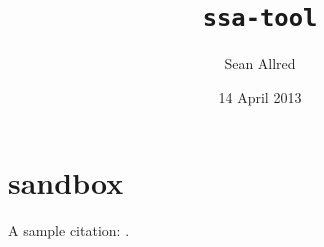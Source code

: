 \documentclass{cs-smp}[2013/12/23]
\title
                         {\texttt{ssa-tool}}%
            [A Utility for the Creation and Evaluation \\
                   of Self-Stabilizing Algorithms]
\author
                            {Sean Allred}%
                           [Alan Jamieson]
\date
                            {14 April 2013}
\begin{document}
\maketitle
\begin{abstract}
  
\end{abstract}




\printglossaries

\printbibliography
\appendix


\section{sandbox}
A sample citation: \autocites[26.1--26.45]{atallah2009algorithms}{Chen1991147}.
\end{document}
